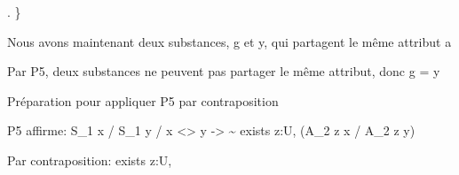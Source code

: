 \documentclass[10pt]{report}
\begin{document}
\begin{coqdoccode}
\coqdocindent{3.00em}
 .\coqdoceol
\coqdocindent{2.00em}
\}\coqdoceol
\coqdocindent{2.00em}
\coqdoceol
\coqdocindent{2.00em}
\begin{coqdoccomment}
\coqdocindent{0.50em}
Nous\coqdocindent{0.50em}
avons\coqdocindent{0.50em}
maintenant\coqdocindent{0.50em}
deux\coqdocindent{0.50em}
substances,\coqdocindent{0.50em}
g\coqdocindent{0.50em}
et\coqdocindent{0.50em}
y,\coqdocindent{0.50em}
qui\coqdocindent{0.50em}
partagent\coqdocindent{0.50em}
le\coqdocindent{0.50em}
même\coqdocindent{0.50em}
attribut\coqdocindent{0.50em}
a\coqdocindent{0.50em}
\end{coqdoccomment}
\coqdoceol
\coqdocindent{2.00em}
\begin{coqdoccomment}
\coqdocindent{0.50em}
Par\coqdocindent{0.50em}
P5,\coqdocindent{0.50em}
deux\coqdocindent{0.50em}
substances\coqdocindent{0.50em}
ne\coqdocindent{0.50em}
peuvent\coqdocindent{0.50em}
pas\coqdocindent{0.50em}
partager\coqdocindent{0.50em}
le\coqdocindent{0.50em}
même\coqdocindent{0.50em}
attribut,\coqdocindent{0.50em}
donc\coqdocindent{0.50em}
g\coqdocindent{0.50em}
=\coqdocindent{0.50em}
y\coqdocindent{0.50em}
\end{coqdoccomment}
\coqdoceol
\coqdocindent{2.00em}
\coqdoceol
\coqdocindent{2.00em}
\begin{coqdoccomment}
\coqdocindent{0.50em}
Préparation\coqdocindent{0.50em}
pour\coqdocindent{0.50em}
appliquer\coqdocindent{0.50em}
P5\coqdocindent{0.50em}
par\coqdocindent{0.50em}
contraposition\coqdocindent{0.50em}
\end{coqdoccomment}
\coqdoceol
\coqdocindent{2.00em}
\begin{coqdoccomment}
\coqdocindent{0.50em}
P5\coqdocindent{0.50em}
affirme:\coqdocindent{0.50em}
S\_1\coqdocindent{0.50em}
x\coqdocindent{0.50em}
/\coqdocindent{0.50em}
S\_1\coqdocindent{0.50em}
y\coqdocindent{0.50em}
/\coqdocindent{0.50em}
x\coqdocindent{0.50em}
<>\coqdocindent{0.50em}
y\coqdocindent{0.50em}
->\coqdocindent{0.50em}
\~{}\coqdocindent{0.50em}
exists\coqdocindent{0.50em}
z:U,\coqdocindent{0.50em}
(A\_2\coqdocindent{0.50em}
z\coqdocindent{0.50em}
x\coqdocindent{0.50em}
/\coqdocindent{0.50em}
A\_2\coqdocindent{0.50em}
z\coqdocindent{0.50em}
y)\coqdocindent{0.50em}
\end{coqdoccomment}
\coqdoceol
\coqdocindent{2.00em}
\begin{coqdoccomment}
\coqdocindent{0.50em}
Par\coqdocindent{0.50em}
contraposition:\coqdocindent{0.50em}
exists\coqdocindent{0.50em}
z:U,\coqdocindent{0.50em}

\end{coqdoccomment}
\end{coqdoccode}
\end{document}
